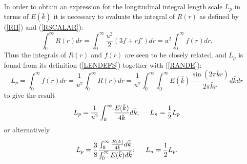 \documentclass[dvips]{article}
\begin{document}
In order to obtain an expression for the longitudinal integral
length scale $L_{p}$ in terms of $E(\bar{k})$ it is necessary to
evaluate the integral of $R(r)$ as defined by (\ref{RII}) and (\ref{RSCALAR}):
\[
\int_{0}^{\infty}R(r)dr = \int_{0}^{\infty}\frac{u^{2}}{2}(3f+rf')dr
 = u^{2}\int_{0}^{\infty}f(r)dr.
\]
Thus the integrals of $R(r)$ and $f(r)$ are seen to be closely related, and
$L_{p}$ is found from its definition (\ref{LENDEFS}) together with
(\ref{RANDE}): 
\[
L_{p} = \int_{0}^{\infty} f(r)dr = \frac{1}{u^{2}}\int_{0}^{\infty} R(r)dr 
= \frac{1}{u^{2}}\int_{0}^{\infty}\int_{0}^{\infty} E(\bar{k})
\frac{\sin{(2\pi\bar{k}r)}}{2\pi\bar{k}r} d\bar{k}dr
\]
to give the result
\begin{equation}
L_{p} = \frac{1}{u^{2}}\int_{0}^{\infty} \frac{E(\bar{k})}{4\bar{k}}
d\bar{k};\hspace{5mm}
L_{n} = \frac{1}{2}L_{p}
\end{equation}
or alternatively
\begin{equation}
L_{p} = \frac{3}{8}\frac{\int_{0}^{\infty} \frac{E(\bar{k})}{4\bar{k}}
d\bar{k}}{\int_{0}^{\infty} E(\bar{k})d\bar{k}};\hspace{5mm}
L_{n} = \frac{1}{2}L_{p}.
\label{INTLENEK}
\end{equation}
\end{document}
